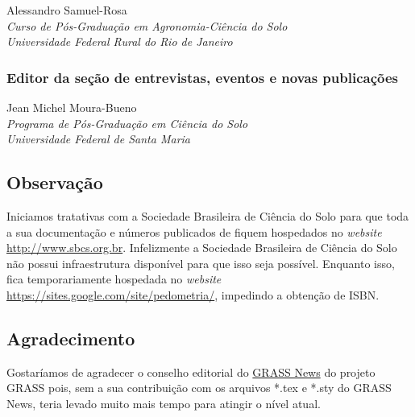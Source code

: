 Alessandro Samuel-Rosa\\
\textit{Curso de Pós-Graduação em Agronomia-Ciência do Solo}\\
\textit{Universidade Federal Rural do Rio de Janeiro}\\

\subsubsection{Editor da seção de entrevistas, eventos e novas publicações}
Jean Michel Moura-Bueno\\
\textit{Programa de Pós-Graduação em Ciência do Solo}\\
\textit{Universidade Federal de Santa Maria}\\

\subsection{Observação}

Iniciamos tratativas com a Sociedade Brasileira de Ciência do Solo para que toda a sua documentação e números publicados de \pedometria fiquem hospedados no \textit{website} \url{http://www.sbcs.org.br}. Infelizmente a Sociedade  Brasileira de Ciência do Solo não possui infraestrutura disponível para que isso seja possível. Enquanto isso, \pedometria fica temporariamente hospedada no \textit{website} \url{https://sites.google.com/site/pedometria/}, impedindo a obtenção de ISBN.

\subsection{Agradecimento}

Gostaríamos de agradecer o conselho editorial do \href{http://grass.osgeo.org/newsletter/}{GRASS News} do projeto GRASS pois, sem a sua contribuição com os arquivos *.tex e *.sty do GRASS News, \pedometria teria levado muito mais tempo para atingir o nível atual.
